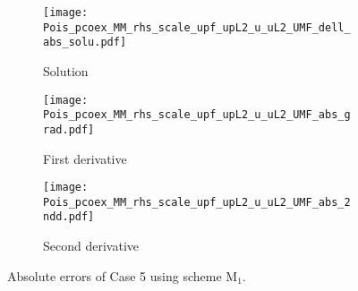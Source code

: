 \documentclass[final,3p]{elsarticle}
\begin{document}
\begin{figure}[!ht]
    \begin{subfigure}{5.5cm}
        \texttt{[image: Pois\_pcoex\_MM\_rhs\_scale\_upf\_upL2\_u\_uL2\_UMF\_dell\_abs\_solu.pdf]}
        \caption{Solution}
        \label{Fig:Pois_pcoex_MM_rhs_scale_upf_upL2_u_uL2_UMF_abs_solu}
    \end{subfigure}
    \begin{subfigure}{5.5cm}
        \texttt{[image: Pois\_pcoex\_MM\_rhs\_scale\_upf\_upL2\_u\_uL2\_UMF\_abs\_grad.pdf]}
        \caption{First derivative}
        \label{Fig:Pois_pcoex_MM_rhs_scale_upf_upL2_u_uL2_UMF_abs_grad}
    \end{subfigure}
    \begin{subfigure}{5.5cm}
        \texttt{[image: Pois\_pcoex\_MM\_rhs\_scale\_upf\_upL2\_u\_uL2\_UMF\_abs\_2ndd.pdf]}
        \caption{Second derivative}
        \label{Fig:Pois_pcoex_MM_rhs_scale_upf_upL2_u_uL2_UMF_abs_2ndd}
    \end{subfigure}
\caption{Absolute errors of Case 5 using scheme $\text{M}_1$.}
\label{Pois_pcoex_MM_rhs_scale_upf_upL2_u_uL2_UMF_abs}
\end{figure}


\end{document}
